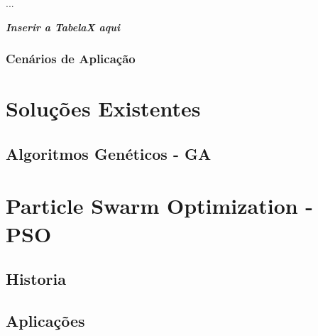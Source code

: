             ...\newline

            \textit{\textbf{Inserir a TabelaX aqui}}\newline


        \subsubsection{Cenários de Aplicação}
            \lipsum[3]
        
    




\section{Soluções Existentes}
\lipsum[3]

\subsection{Algoritmos Genéticos - GA}
\lipsum[2]



\section{Particle Swarm Optimization - PSO}
\lipsum[4]

\subsection{Historia}
\lipsum[2]

\subsection{Aplicações}
\lipsum[3]

